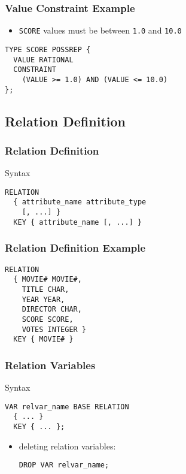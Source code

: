 \documentclass[dvipsnames]{beamer}
\theoremstyle{plain}
\begin{document}
\begin{frame}[fragile]
  \frametitle{Value Constraint Example}

  \begin{example}
    \begin{itemize}
      \item \texttt{SCORE} values must be between \texttt{1.0} and \texttt{10.0}
    \end{itemize}

    \begin{lstlisting}
TYPE SCORE POSSREP {
  VALUE RATIONAL
  CONSTRAINT
    (VALUE >= 1.0) AND (VALUE <= 10.0)
};
    \end{lstlisting}
  \end{example}
\end{frame}

\subsection{Relation Definition}

\begin{frame}[fragile]
  \frametitle{Relation Definition}

  \begin{block}{Syntax}
    \begin{lstlisting}
RELATION
  { attribute_name attribute_type
    [, ...] }
  KEY { attribute_name [, ...] }
    \end{lstlisting}
  \end{block}
\end{frame}

\begin{frame}[fragile]
  \frametitle{Relation Definition Example}

  \begin{example}
    \begin{lstlisting}
RELATION
  { MOVIE# MOVIE#,
    TITLE CHAR,
    YEAR YEAR,
    DIRECTOR CHAR,
    SCORE SCORE,
    VOTES INTEGER }
  KEY { MOVIE# }
    \end{lstlisting}
  \end{example}
\end{frame}

\begin{frame}[fragile]
  \frametitle{Relation Variables}

  \begin{block}{Syntax}
    \begin{lstlisting}
VAR relvar_name BASE RELATION
  { ... }
  KEY { ... };
    \end{lstlisting}
  \end{block}

  \pause
  \begin{itemize}
   \item deleting relation variables:
    \begin{lstlisting}
DROP VAR relvar_name;
    \end{lstlisting}
  \end{itemize}
\end{frame}
\end{document}

